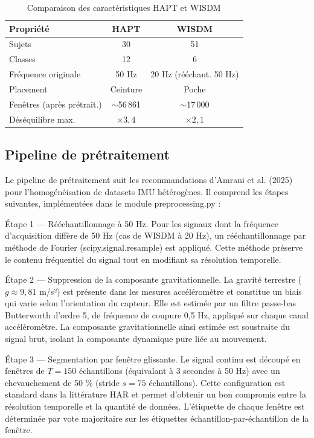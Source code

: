 \begin{table}[H]
\centering
\small
\begin{tabularx}{0.92\textwidth}{|Y|c|c|}
\hline
\textbf{Propriété} & \textbf{HAPT} & \textbf{WISDM} \\
\hline
Sujets                    & 30  & 51 \\
Classes                   & 12  & 6 \\
Fréquence originale       & 50 Hz & 20 Hz (rééchant. 50 Hz) \\
Placement                 & Ceinture & Poche \\
Fenêtres (après prétrait.) & $\sim$56\,861 & $\sim$17\,000 \\
Déséquilibre max.         & $\times 3{,}4$ & $\times 2{,}1$ \\
\hline
\end{tabularx}
\caption{Comparaison des caractéristiques HAPT et WISDM}
\label{tab:hapt_wisdm}
\end{table}

\subsection{Pipeline de prétraitement}

Le pipeline de prétraitement suit les recommandations d'Amrani et al. (2025) pour l'homogénéisation de datasets IMU hétérogènes. Il comprend les étapes suivantes, implémentées dans le module preprocessing.py :

Étape 1 — Rééchantillonnage à 50 Hz. Pour les signaux dont la fréquence d'acquisition diffère de 50 Hz (cas de WISDM à 20 Hz), un rééchantillonnage par méthode de Fourier (scipy.signal.resample) est appliqué. Cette méthode préserve le contenu fréquentiel du signal tout en modifiant sa résolution temporelle.

Étape 2 — Suppression de la composante gravitationnelle. La gravité terrestre ($g \approx 9{,}81$ m/s²) est présente dans les mesures accéléromètre et constitue un biais qui varie selon l'orientation du capteur. Elle est estimée par un filtre passe-bas Butterworth d'ordre 5, de fréquence de coupure 0,5 Hz, appliqué sur chaque canal accéléromètre. La composante gravitationnelle ainsi estimée est soustraite du signal brut, isolant la composante dynamique pure liée au mouvement.

Étape 3 — Segmentation par fenêtre glissante. Le signal continu est découpé en fenêtres de $T = 150$ échantillons (équivalant à 3 secondes à 50 Hz) avec un chevauchement de 50 \% (stride $s = 75$ échantillons). Cette configuration est standard dans la littérature HAR et permet d'obtenir un bon compromis entre la résolution temporelle et la quantité de données. L'étiquette de chaque fenêtre est déterminée par vote majoritaire sur les étiquettes échantillon-par-échantillon de la fenêtre.

